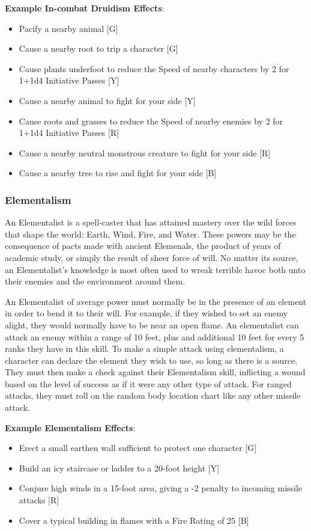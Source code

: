 \documentclass[oneside]{book}
\begin{document}
\begin{multicols}{2}
\textbf{Example In-combat Druidism Effects}: 
	\begin{itemize}
		\setlength{\itemsep}{0cm}%
  		\setlength{\parskip}{0cm}%
		\item{ \small Pacify a nearby animal [G]}
		\item{ \small Cause a nearby root to trip a character [G]}
		\item{ \small Cause plants underfoot to reduce the Speed of nearby characters by 2 for 1+1d4 Initiative Passes [Y]}
		\item{ \small Cause a nearby animal to fight for your side [Y]}
		\item{ \small Cause roots and grasses to reduce the Speed of nearby enemies by 2 for 1+1d4 Initiative Passes [R]}
		\item{ \small Cause a nearby neutral monstrous creature to fight for your side [R]}
		\item{ \small Cause a nearby tree to rise and fight for your side [B]}
	\end{itemize}

\subsubsection{Elementalism}
An Elementalist is a spell-caster that has attained mastery over the  wild forces that shape the world: Earth, Wind, Fire, and Water. These powers may be the consequence of pacts made with ancient Elemenals, the product of years of academic study, or simply the result of sheer force of will. No matter its source, an Elementalist's knowledge is most often used to wreak terrible havoc both unto their enemies and the environment around them. 

An Elementalist of average power must normally be in the presence of an element in order to bend it to their will. For example, if they wished to set an enemy alight, they would normally have to be near an open flame. An elementalist can attack an enemy within a range of 10 feet, plus and additional 10 feet for every 5 ranks they have in this skill. To make a simple attack using elementalism, a character can declare the element they wish to use, so long as there is a source. They must then make a check against their Elementalism skill, inflicting a wound based on the level of success as if it were any other type of attack. For ranged attacks, they must roll on the  random body location chart like any other missile attack.

\textbf{Example Elementalism Effects}:
	\begin{itemize}
		\setlength{\itemsep}{0cm}%
  		\setlength{\parskip}{0cm}%
		\item{ \small Erect a small earthen wall sufficient to protect one character [G]}
		\item{ \small Build an icy staircase or ladder to a 20-foot height [Y]}
		\item{ \small Conjure high winds in a 15-foot area, giving a -2 penalty to incoming missile attacks [R]}
		\item{ \small Cover a typical building in flames with a Fire Rating of 25  [B]}
	\end{itemize}


\end{multicols}
\end{document}
